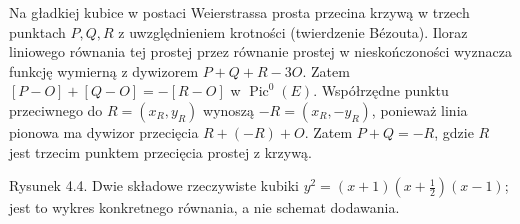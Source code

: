 \begin{przyklad}
Na gładkiej kubice w postaci Weierstrassa
prosta przecina krzywą w trzech punktach
$P,Q,R$ z uwzględnieniem krotności
(twierdzenie Bézouta). Iloraz liniowego
równania tej prostej przez równanie prostej
w nieskończoności wyznacza funkcję wymierną
z dywizorem $P+Q+R-3O$.
Zatem $[P-O]+[Q-O]=-[R-O]$ w
$\operatorname{Pic}^0(E)$. Współrzędne punktu
przeciwnego do $R=(x_R,y_R)$ wynoszą
$-R=(x_R,-y_R)$, ponieważ linia pionowa ma
dywizor przecięcia $R+(-R)+O$.
Zatem $P+Q=-R$, gdzie $R$ jest trzecim
punktem przecięcia prostej z krzywą.
\end{przyklad}

\begin{center}

{\small Rysunek 4.4. Dwie składowe rzeczywiste kubiki $y^2=(x+1)(x+\tfrac12)(x-1)$; jest to wykres konkretnego równania, a nie schemat dodawania.}\par
\end{center}

